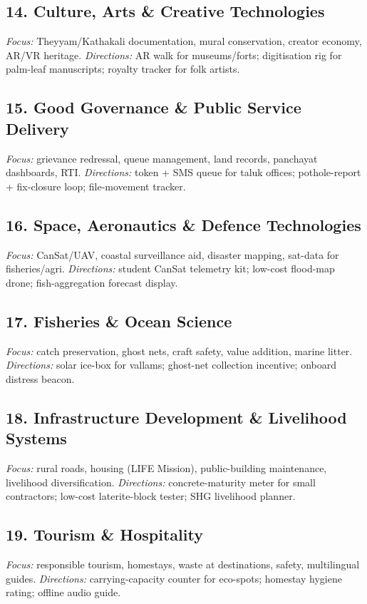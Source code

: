 \documentclass[11pt,a4paper]{article}
\begin{document}
\subsection{14. Culture, Arts \& Creative Technologies}
\textit{Focus:} Theyyam/Kathakali documentation, mural conservation, creator economy, AR/VR heritage. \textit{Directions:} AR walk for museums/forts; digitisation rig for palm-leaf manuscripts; royalty tracker for folk artists.

\subsection{15. Good Governance \& Public Service Delivery}
\textit{Focus:} grievance redressal, queue management, land records, panchayat dashboards, RTI. \textit{Directions:} token + SMS queue for taluk offices; pothole-report + fix-closure loop; file-movement tracker.

\subsection{16. Space, Aeronautics \& Defence Technologies}
\textit{Focus:} CanSat/UAV, coastal surveillance aid, disaster mapping, sat-data for fisheries/agri. \textit{Directions:} student CanSat telemetry kit; low-cost flood-map drone; fish-aggregation forecast display.

\subsection{17. Fisheries \& Ocean Science}
\textit{Focus:} catch preservation, ghost nets, craft safety, value addition, marine litter. \textit{Directions:} solar ice-box for vallams; ghost-net collection incentive; onboard distress beacon.

\subsection{18. Infrastructure Development \& Livelihood Systems}
\textit{Focus:} rural roads, housing (LIFE Mission), public-building maintenance, livelihood diversification. \textit{Directions:} concrete-maturity meter for small contractors; low-cost laterite-block tester; SHG livelihood planner.

\subsection{19. Tourism \& Hospitality}
\textit{Focus:} responsible tourism, homestays, waste at destinations, safety, multilingual guides. \textit{Directions:} carrying-capacity counter for eco-spots; homestay hygiene rating; offline audio guide.
\end{document}
